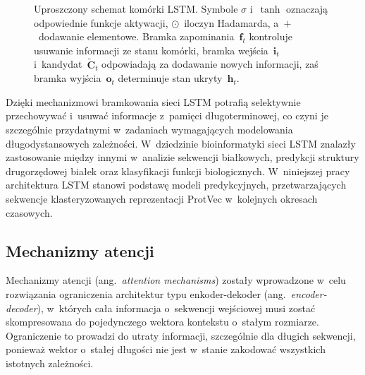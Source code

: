 \begin{figure}[ht]
    \caption{Uproszczony schemat komórki LSTM. Symbole $\sigma$ i~$\tanh$ oznaczają odpowiednie funkcje aktywacji, $\odot$~iloczyn Hadamarda, a~$+$~dodawanie elementowe. Bramka zapominania~$\mathbf{f}_t$ kontroluje usuwanie informacji ze stanu komórki, bramka wejścia~$\mathbf{i}_t$ i~kandydat~$\tilde{\mathbf{C}}_t$ odpowiadają za dodawanie nowych informacji, zaś bramka wyjścia~$\mathbf{o}_t$ determinuje stan ukryty~$\mathbf{h}_t$.}
    \label{fig:lstm-cell}
\end{figure}

Dzięki mechanizmowi bramkowania sieci LSTM potrafią selektywnie przechowywać i~usuwać informacje z~pamięci długoterminowej, co czyni je szczególnie przydatnymi w~zadaniach wymagających modelowania długodystansowych zależności. W~dziedzinie bioinformatyki sieci LSTM znalazły zastosowanie między innymi w~analizie sekwencji białkowych, predykcji struktury drugorzędowej białek oraz klasyfikacji funkcji biologicznych. W~niniejszej pracy architektura LSTM stanowi podstawę modeli predykcyjnych, przetwarzających sekwencje klasteryzowanych reprezentacji ProtVec w~kolejnych okresach czasowych.

\subsection{Mechanizmy atencji}
\label{sec:atencja}

Mechanizmy atencji (ang.~\textit{attention mechanisms}) zostały wprowadzone w~celu rozwiązania ograniczenia architektur typu enkoder-dekoder (ang.~\textit{encoder-decoder}), w~których cała informacja o~sekwencji wejściowej musi zostać skompresowana do pojedynczego wektora kontekstu o~stałym rozmiarze. Ograniczenie to prowadzi do utraty informacji, szczególnie dla długich sekwencji, ponieważ wektor o~stałej długości nie jest w~stanie zakodować wszystkich istotnych zależności.

